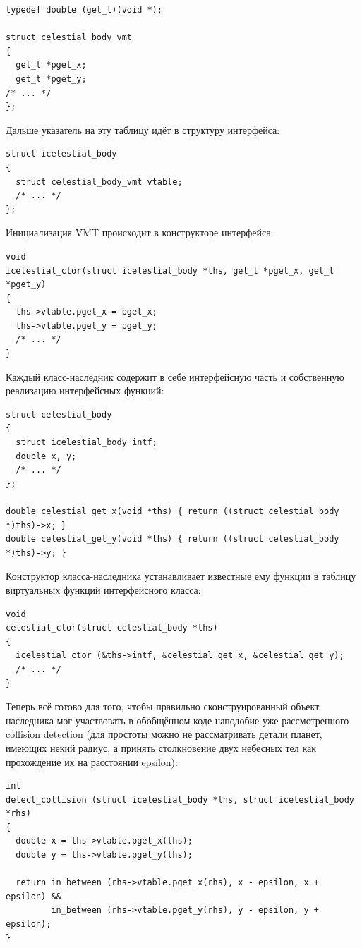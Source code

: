 \documentclass[a4paper,12pt,oneside]{article}
\begin{document}
\begin{lstlisting}
typedef double (get_t)(void *);

struct celestial_body_vmt
{
  get_t *pget_x;
  get_t *pget_y;
/* ... */
};
\end{lstlisting}

Дальше указатель на эту таблицу идёт в структуру интерфейса:

\begin{lstlisting}
struct icelestial_body
{
  struct celestial_body_vmt vtable;
  /* ... */
};
\end{lstlisting}

Инициализация VMT происходит в конструкторе интерфейса:

\begin{lstlisting}
void
icelestial_ctor(struct icelestial_body *ths, get_t *pget_x, get_t *pget_y)
{
  ths->vtable.pget_x = pget_x;
  ths->vtable.pget_y = pget_y;
  /* ... */
}
\end{lstlisting}

Каждый класс-наследник содержит в себе интерфейсную часть и собственную реализацию интерфейсных функций:

\begin{lstlisting}
struct celestial_body
{
  struct icelestial_body intf;
  double x, y;
  /* ... */
};

double celestial_get_x(void *ths) { return ((struct celestial_body *)ths)->x; }
double celestial_get_y(void *ths) { return ((struct celestial_body *)ths)->y; }
\end{lstlisting}

Конструктор класса-наследника устанавливает известные ему функции в таблицу виртуальных функций интерфейсного класса:

\begin{lstlisting}
void 
celestial_ctor(struct celestial_body *ths)
{
  icelestial_ctor (&ths->intf, &celestial_get_x, &celestial_get_y);
  /* ... */  
}
\end{lstlisting}

Теперь всё готово для того, чтобы правильно сконструированный объект наследника мог участвовать в обобщённом коде наподобие уже рассмотренного collision detection (для простоты можно не рассматривать детали планет, имеющих некий радиус, а принять столкновение двух небесных тел как прохождение их на расстоянии epsilon):

\begin{lstlisting}
int
detect_collision (struct icelestial_body *lhs, struct icelestial_body *rhs)
{
  double x = lhs->vtable.pget_x(lhs);
  double y = lhs->vtable.pget_y(lhs);
 
  return in_between (rhs->vtable.pget_x(rhs), x - epsilon, x + epsilon) && 
         in_between (rhs->vtable.pget_y(rhs), y - epsilon, y + epsilon);
}
\end{lstlisting}
\end{document}
